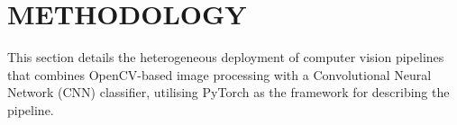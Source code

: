 \documentclass[]{spie}  %
\begin{document}





\section{METHODOLOGY}
\label{sec:methodology}

This section details the heterogeneous deployment of computer vision pipelines that combines OpenCV-based image processing with a Convolutional Neural Network (CNN) classifier, utilising PyTorch as the framework for describing the pipeline. 
\end{document}

